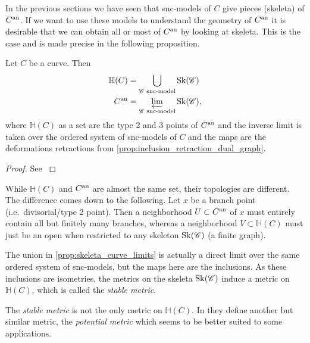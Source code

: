In the previous sections we have seen that snc-models of $C$ give pieces (skeleta) of $C{}^{\text{an}}$. 
If we want to use these models to understand the geometry of $C{}^{\text{an}}$ it is desirable that we can obtain all or most of $C{}^{\text{an}}$ by looking at skeleta. 
This is the case and is made precise in the following proposition. 
\begin{proposition}\label{prop:skeleta_curve_limits}
	Let $C$ be a curve. Then 
	\begin{align*}
		\mathbb H(C) &= \bigcup_{\mathscr C \text{ snc-model}} \operatorname{Sk}(\mathscr C) \\
		C{}^{\text{an}} &= \varprojlim_{\mathscr C \text{ snc-model}} \operatorname{Sk}(\mathscr C)
	,\end{align*}
	where $\mathbb{H}(C)$ as a set are the type 2 and 3 points of $C{}^{\text{an}}$ and the inverse limit is taken over the ordered system of snc-models of $C$ and the maps are the deformations retractions from \cref{prop:inclusion_retraction_dual_graph}.
\end{proposition}
\begin{proof}
	See \cite[§2.2.2 and  lem.\ 2.3.2]{bakerWeightFunctionsBerkovich2016}
\end{proof}
\begin{remark}
	While $\mathbb{H}(C)$ and $C{}^{\text{an}}$ are almost the same set, their topologies are different. 
	The difference comes down to the following. 
	Let $x$ be a branch point (i.e.\ divisorial/type 2 point).
	Then a neighborhood $U \subset C{}^{\text{an}}$ of $x$ must entirely contain all but finitely many branches, whereas a neighborhood $V \subset \mathbb{H}(C)$ must just be an open when restricted to any skeleton $\operatorname{Sk}(\mathscr C)$ (a finite graph). 
\end{remark}

The union in \cref{prop:skeleta_curve_limits} is actually a direct limit over the same ordered system of snc-models, but the maps here are the inclusions. 
As these inclusions are isometries, the metrics on the skeleta $\operatorname{Sk}(\mathscr C)$ induce a metric on $\mathbb{H}(C)$, which is called the \emph{stable metric}. 

\begin{remark}
	The \emph{stable metric} is not the only metric on $\mathbb{H}(C)$. 
	In \cite{bakerWeightFunctionsBerkovich2016} they define another but similar metric, the \emph{potential metric} which seems to be better suited to some applications. 
\end{remark}

